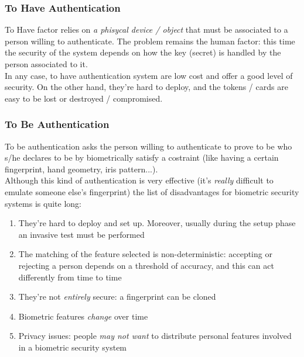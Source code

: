 \documentclass{article}
\begin{document}
				\subsubsection{To Have Authentication}
					To Have factor relies on \emph{a phisycal device / object} that must be associated to a person willing to authenticate. The problem remains the human factor: this time the security of the system depends on how the key (secret) is handled by the person associated to it.\\
					In any case, to have authentication system are low cost and offer a good level of security. On the other hand, they're hard to deploy, and the tokens / cards are easy to be lost or destroyed / compromised.
				
				\subsubsection{To Be Authentication}
					To be authentication asks the person willing to authenticate to prove to be who s/he declares to be by biometrically satisfy a costraint (like having a certain fingerprint, hand geometry, iris pattern...).\\
					Although this kind of authentication is very effective (it's \emph{really} difficult to emulate someone else's fingerprint) the list of disadvantages for biometric security systems is quite long:
					\begin{enumerate}
						\item They're hard to deploy and set up. Moreover, usually during the setup phase an invasive test must be performed
						\item The matching of the feature selected is non-deterministic: accepting or rejecting a person depends on a threshold of accuracy, and this can act differently from time to time
						\item They're not \emph{entirely} secure: a fingerprint can be cloned
						\item Biometric features \emph{change} over time
						\item Privacy issues: people \emph{may not want} to distribute personal features involved in a biometric security system
					\end{enumerate}
				
\end{document}
